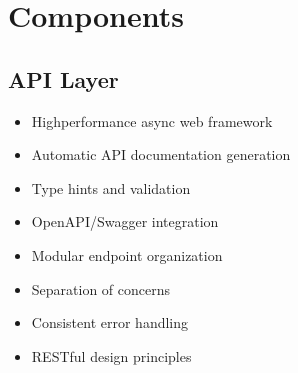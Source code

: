 \documentclass[letterpaper,10pt,english]{sphinxmanual}
\begin{document}
\section{Components}
\label{\detokenize{architecture:components}}

\subsection{API Layer}
\label{\detokenize{architecture:api-layer}}\begin{description}
\begin{itemize}
\item {} 
\sphinxAtStartPar
High\sphinxhyphen{}performance async web framework

\item {} 
\sphinxAtStartPar
Automatic API documentation generation

\item {} 
\sphinxAtStartPar
Type hints and validation

\item {} 
\sphinxAtStartPar
OpenAPI/Swagger integration

\end{itemize}

\begin{itemize}
\item {} 
\sphinxAtStartPar
Modular endpoint organization

\item {} 
\sphinxAtStartPar
Separation of concerns

\item {} 
\sphinxAtStartPar
Consistent error handling

\item {} 
\sphinxAtStartPar
RESTful design principles

\end{itemize}

\end{description}
\end{document}
